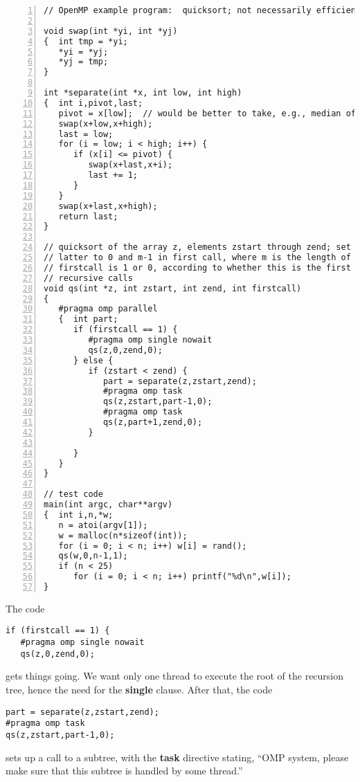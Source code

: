 \begin{Verbatim}[fontsize=\relsize{-2},numbers=left]
// OpenMP example program:  quicksort; not necessarily efficient

void swap(int *yi, int *yj)
{  int tmp = *yi;
   *yi = *yj;
   *yj = tmp;
}

int *separate(int *x, int low, int high)
{  int i,pivot,last;
   pivot = x[low];  // would be better to take, e.g., median of 1st 3 elts
   swap(x+low,x+high);
   last = low;
   for (i = low; i < high; i++) {
      if (x[i] <= pivot) {
         swap(x+last,x+i);
         last += 1;
      }
   }
   swap(x+last,x+high);
   return last;
}

// quicksort of the array z, elements zstart through zend; set the
// latter to 0 and m-1 in first call, where m is the length of z;
// firstcall is 1 or 0, according to whether this is the first of the
// recursive calls
void qs(int *z, int zstart, int zend, int firstcall)
{
   #pragma omp parallel
   {  int part;
      if (firstcall == 1) {
         #pragma omp single nowait
         qs(z,0,zend,0);
      } else {
         if (zstart < zend) {
            part = separate(z,zstart,zend);
            #pragma omp task
            qs(z,zstart,part-1,0);
            #pragma omp task
            qs(z,part+1,zend,0);
         }

      }
   }
}

// test code
main(int argc, char**argv)
{  int i,n,*w;
   n = atoi(argv[1]);
   w = malloc(n*sizeof(int));
   for (i = 0; i < n; i++) w[i] = rand();
   qs(w,0,n-1,1);
   if (n < 25)
      for (i = 0; i < n; i++) printf("%d\n",w[i]);
}
\end{Verbatim}

The code

\begin{Verbatim}[fontsize=\relsize{-2}]
if (firstcall == 1) {
   #pragma omp single nowait
   qs(z,0,zend,0);
\end{Verbatim}

gets things going.  We want only one thread to execute the root of the
recursion tree, hence the need for the {\bf single} clause.  After that,
the code

\begin{Verbatim}[fontsize=\relsize{-2}]
part = separate(z,zstart,zend);
#pragma omp task
qs(z,zstart,part-1,0);
\end{Verbatim}

sets up a call to a subtree, with the {\bf task} directive stating,
``OMP system, please make sure that this subtree is handled by some
thread.''

